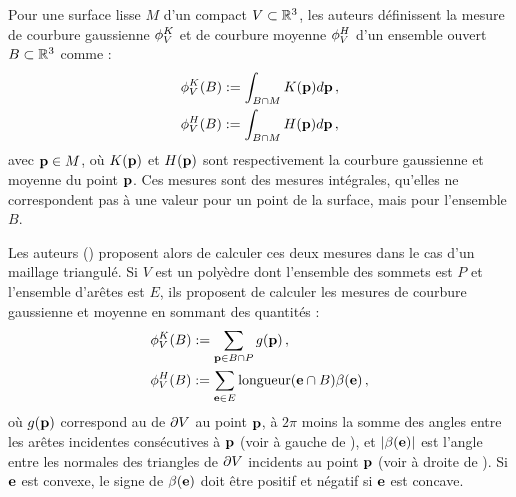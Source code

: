 Pour une surface lisse $M$ d'un compact $V \subset \mathbb{R}^3$, les auteurs
définissent la mesure de courbure gaussienne $\phi^{K}_V$ et de
courbure moyenne $\phi^{H}_V$ d'un ensemble ouvert $B \subset \mathbb{R}^3$ comme :
%
\begin{align}
  &\phi^{K}_V(B) := \int_{B \cap M} K(\mathbf{p}) d\mathbf{p} \,,\\
  &\phi^{H}_V(B)  := \int_{B \cap M} H(\mathbf{p})  d\mathbf{p} \,,
\end{align}
%
avec $\mathbf{p} \in M$, où $K(\mathbf{p})$ et $H(\mathbf{p})$ sont respectivement
la courbure gaussienne et moyenne du point $\mathbf{p}$. Ces mesures sont des mesures
intégrales, \cad qu'elles ne correspondent pas à une valeur pour un point de
la surface, mais pour l'ensemble $B$.


Les auteurs () proposent alors de calculer ces deux
mesures dans le cas d'un maillage triangulé. Si $V$ est un polyèdre dont
l'ensemble des sommets est $P$ et l'ensemble d'arêtes est $E$, ils
proposent de calculer les mesures de courbure gaussienne et moyenne en sommant
des quantités :
%
\begin{align}
  &\phi^{K}_V(B) := \sum_{\mathbf{p} \in B \cap P} g(\mathbf{p}) \,,\\
  &\phi^{H}_V(B)  := \sum_{\mathbf{e} \in E} \text{longueur}(\mathbf{e} \cap B) \beta(\mathbf{e}) \,,
\end{align}
%
où $g(\mathbf{p})$ correspond au  de $\partial V$ au point
$\mathbf{p}$, \cad à $2\pi$ moins la somme des angles entre les arêtes incidentes
consécutives à $\mathbf{p}$  (voir à gauche de ), et
$|\beta(\mathbf{e})|$ est l'angle entre les normales des triangles de $\partial V$
incidents au point $\mathbf{p}$ (voir à droite de ). Si
$\mathbf{e}$ est convexe, le signe de $\beta(\mathbf{e})$ doit être positif et négatif si
$\mathbf{e}$ est concave.


